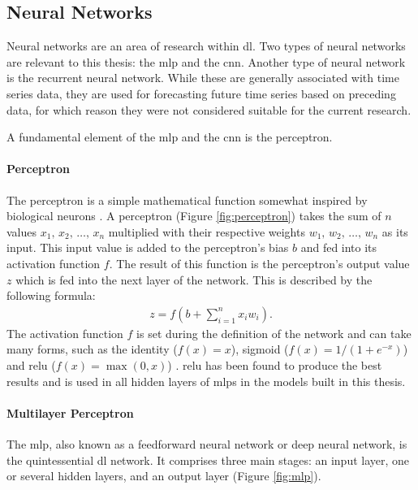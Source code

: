 \subsection{Neural Networks}
Neural networks are an area of research within \ac{dl}. Two types of neural networks are relevant to this thesis: the \ac{mlp} and the \ac{cnn}. Another type of neural network is the recurrent neural network. While these are generally associated with time series data, they are used for forecasting future time series based on preceding data, for which reason they were not considered suitable for the current research.

A fundamental element of the \ac{mlp} and the \ac{cnn} is the perceptron.

\paragraph*{Perceptron}
The perceptron is a simple mathematical function somewhat inspired by biological neurons \cite[]{rosenblatt_perceptron_1958}. A perceptron (Figure \ref{fig:perceptron}) takes the sum of \(n\) values \(x_{1},\,x_{2},\,\ldots,\,x_{n}\) multiplied with their respective weights \(w_{1},\,w_{2},\,\ldots,\,w_{n}\) as its input. This input value is added to the perceptron's bias \(b\) and fed into its activation function \(f\). The result of this function is the perceptron's output value \(z\) which is fed into the next layer of the network. This is described by the following formula:
\begin{align}
    z = f\left(b + \sum_{i = 1}^{n}x_{i}w_{i}\right).
\end{align}
The activation function \(f\) is set during the definition of the network and can take many forms, such as the identity (\(f\left(x\right) = x\)), sigmoid (\(f\left(x\right) = 1 / \left(1 + e^{-x}\right)\)) and \ac{relu} (\(f\left(x\right) = \max\left(0, x\right)\)) \cite[]{hahnloser_digital_2000}. \ac{relu} has been found to produce the best results \cite[]{jarrett_what_2009} and is used in all hidden layers of \ac{mlp}s in the models built in this thesis.



\paragraph*{Multilayer Perceptron}
The \ac{mlp}, also known as a feedforward neural network or deep neural network, is the quintessential \ac{dl} network. It comprises three main stages: an input layer, one or several hidden layers, and an output layer (Figure \ref{fig:mlp}).

